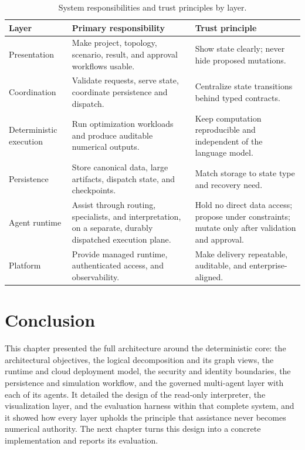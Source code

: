 \begin{table}[!ht]
  \centering
  \begin{tabularx}{\linewidth}{@{}
      >{\raggedright\arraybackslash}p{3.1cm}
      >{\raggedright\arraybackslash}X
      >{\raggedright\arraybackslash}p{4.2cm} @{}}
    \toprule
    \textbf{Layer} & \textbf{Primary responsibility} & \textbf{Trust principle} \\
    \midrule
    Presentation & Make project, topology, scenario, result, and approval
      workflows usable. & Show state clearly; never hide proposed mutations. \\
    \addlinespace
    Coordination & Validate requests, serve state, coordinate persistence and
      dispatch. & Centralize state transitions behind typed contracts. \\
    \addlinespace
    Deterministic execution & Run optimization workloads and produce auditable
      numerical outputs. & Keep computation reproducible and independent of the
      language model. \\
    \addlinespace
    Persistence & Store canonical data, large artifacts, dispatch state, and
      checkpoints. & Match storage to state type and recovery need. \\
    \addlinespace
    Agent runtime & Assist through routing, specialists, and interpretation, on a
      separate, durably dispatched execution plane. & Hold no direct data access;
      propose under constraints; mutate only after validation and approval. \\
    \addlinespace
    Platform & Provide managed runtime, authenticated access, and observability. &
      Make delivery repeatable, auditable, and enterprise-aligned. \\
    \bottomrule
  \end{tabularx}
  \caption{System responsibilities and trust principles by layer.}
  \label{tab:responsibilities}
\end{table}

\section*{Conclusion}

This chapter presented the full architecture around the deterministic core: the
architectural objectives, the logical decomposition and its graph views, the
runtime and cloud deployment model, the security and identity boundaries, the
persistence and simulation workflow, and the governed multi-agent layer with each
of its agents. It detailed the design of the read-only interpreter, the
visualization layer, and the evaluation harness within that complete system, and
it showed how every layer
upholds the principle that assistance never becomes numerical authority. The next
chapter turns this design into a concrete implementation and reports its
evaluation.

